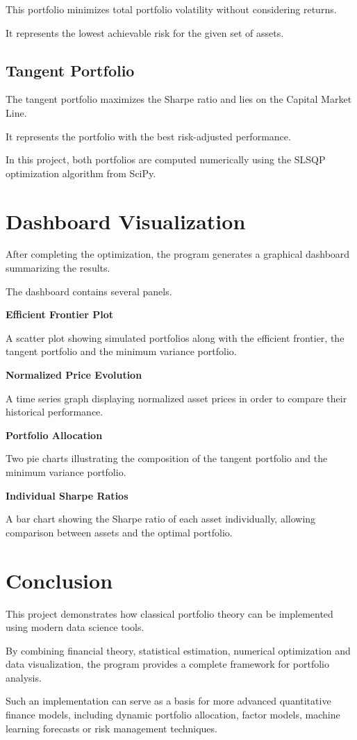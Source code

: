 \documentclass[11pt,a4paper]{article}
\begin{document}
This portfolio minimizes total portfolio volatility without considering returns.

It represents the lowest achievable risk for the given set of assets.

\subsection{Tangent Portfolio}

The tangent portfolio maximizes the Sharpe ratio and lies on the Capital Market Line.

It represents the portfolio with the best risk-adjusted performance.

In this project, both portfolios are computed numerically using the SLSQP optimization algorithm from SciPy.

\section{Dashboard Visualization}

After completing the optimization, the program generates a graphical dashboard summarizing the results.

The dashboard contains several panels.

\textbf{Efficient Frontier Plot}

A scatter plot showing simulated portfolios along with the efficient frontier, the tangent portfolio and the minimum variance portfolio.

\textbf{Normalized Price Evolution}

A time series graph displaying normalized asset prices in order to compare their historical performance.

\textbf{Portfolio Allocation}

Two pie charts illustrating the composition of the tangent portfolio and the minimum variance portfolio.

\textbf{Individual Sharpe Ratios}

A bar chart showing the Sharpe ratio of each asset individually, allowing comparison between assets and the optimal portfolio.

\section{Conclusion}

This project demonstrates how classical portfolio theory can be implemented using modern data science tools.

By combining financial theory, statistical estimation, numerical optimization and data visualization, the program provides a complete framework for portfolio analysis.

Such an implementation can serve as a basis for more advanced quantitative finance models, including dynamic portfolio allocation, factor models, machine learning forecasts or risk management techniques.
\end{document}
